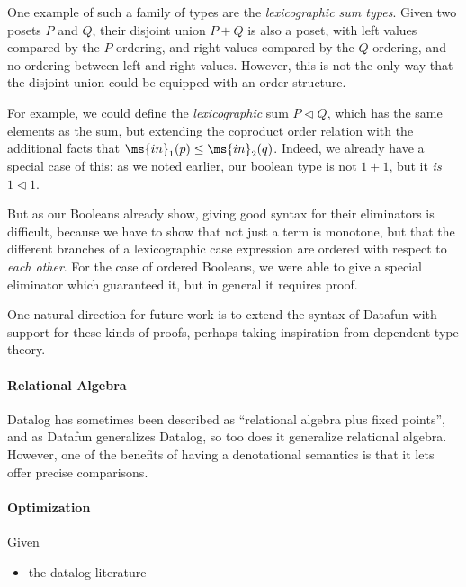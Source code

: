 One example of such a family of types are the \emph{lexicographic sum
  types}. Given two posets $P$ and $Q$, their disjoint union $P + Q$
is also a poset, with left values compared by the $P$-ordering, and
right values compared by the $Q$-ordering, and no ordering between
left and right values. However, this is not the only way that the
disjoint union could be equipped with an order structure.

For example, we could define the \emph{lexicographic} sum $P \lhd Q$,
which has the same elements as the sum, but extending the coproduct order
relation with the additional
facts that $\ms{in}_1(p) \leq \ms{in}_2(q)$. Indeed, we already have a
special case of this: as we noted earlier, our boolean type is not $1
+ 1$, but it \emph{is} $1 \lhd 1$.

But as our Booleans already show, giving good syntax for their
eliminators is difficult, because we have to show that not just a term
is monotone, but that the different branches of a lexicographic case
expression are ordered with respect to \emph{each other}. For the case
of ordered Booleans, we were able to give a special eliminator which
guaranteed it, but in general it requires proof.

One natural direction for future work is to extend the syntax of
Datafun with support for these kinds of proofs, perhaps taking
inspiration from dependent type theory.

\paragraph{Relational Algebra} Datalog has sometimes been described
as ``relational algebra plus fixed points'', and as Datafun
generalizes Datalog, so too does it generalize relational algebra.
However, one of the benefits of having a denotational semantics is
that it lets offer precise comparisons.


\paragraph{Optimization} Given

\cite{magicsets}




\begin{itemize}
\item \TODO the datalog literature
\end{itemize}


